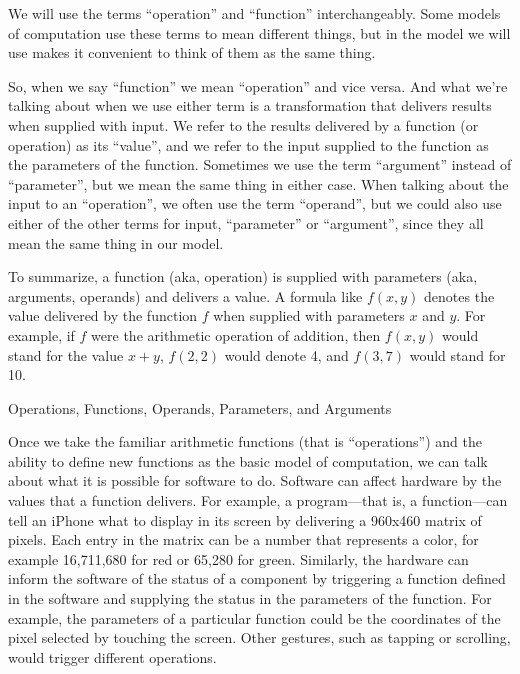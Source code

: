 \begin{aside}
We will use the terms ``operation'' and ``function'' interchangeably.
Some models of computation use these terms to mean different things, but in the model we will use makes it convenient to think of them as the same thing.

So, when we say ``function'' we mean ``operation'' and vice versa. And what we're talking about when we use either term is a transformation that delivers results when supplied with input. We refer to the results delivered by a function (or operation) as its ``value'', and we refer to the input supplied to the function as the parameters of the function. Sometimes we use the term ``argument'' instead of ``parameter'', but we mean the same thing in either case. When talking about the input to an ``operation'', we often use the term ``operand'', but we could also use either of the other terms for input, ``parameter'' or ``argument'', since they all mean the same thing in our model.

To summarize, a function (aka, operation) is supplied with parameters (aka, arguments, operands) and delivers a value.
A formula like $f(x,y)$ denotes the value delivered by the function $f$ when supplied with parameters $x$ and $y$. For example, if $f$ were the arithmetic operation of addition, then $f(x,y)$ would stand for the value $x+y$, $f(2,2)$ would denote 4, and $f(3,7)$ would stand for 10.

\caption{Operations, Functions, Operands, Parameters, and Arguments}
\label{operations-and-functions}
\end{aside}

Once we take the familiar arithmetic functions (that is ``operations'') and the ability to define new functions
as the basic model of computation, we can talk about what it is possible for software to do.
Software can affect
hardware by the values that a function delivers.  For example,
a program---that is, a function---can tell an iPhone what to display
in its screen by delivering a 960x460 matrix of pixels.  Each entry in the matrix
can be a number that represents a color, for example 16,711,680 for
red or 65,280 for green.  Similarly, the hardware can inform the
software of the status of a component by triggering a function defined in the software and supplying the status in the parameters of the function.
For example, the parameters of a particular function could be the coordinates of the pixel selected by touching the screen.  Other gestures, such as tapping or
scrolling, would trigger different operations.

